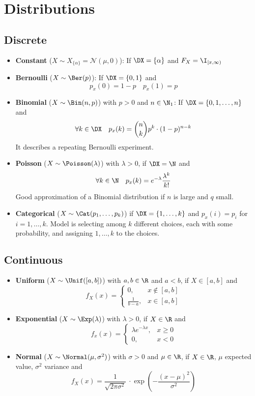 \section{Distributions}
\subsection{Discrete}
\begin{itemize}
  \item \textbf{Constant} (\(X \sim X_{\{\alpha\}} = \mathcal{N}(\mu, 0)\)): If \(\DX = \{\alpha\}\) and \(F_X = \I_{[x, \infty)}\)
  \item \textbf{Bernoulli} (\(X \sim \Ber(p)\)): If \(\DX = \{0, 1\}\) and
  \[p_x(0) = 1 - p \quad p_x(1) = p\]

  \item \textbf{Binomial} (\(X \sim \Bin(n, p)\)) with \(p > 0\) and \(n \in \N_1\): If \(\DX = \{0, 1, \ldots, n\}\) and
  \[\forall k \in \DX \quad p_x(k) = \binom{n}{k} p^k \cdot (1 - p)^{n -k}\]
  It describes a repeating Bernoulli experiment.

  \item \textbf{Poisson} (\(X \sim \Poisson(\lambda)\)) with \(\lambda > 0\), if \(\DX = \N\) and
  \[\forall k \in \N \quad p_x(k) = e^{-\lambda} \frac{\lambda^k}{k!}\]
  Good approximation of a Binomial distribution if \(n\) is large and \(q\) small.

  \item \textbf{Categorical} (\(X \sim \Cat(p_1, \ldots, p_k)\)) if \(\DX = \{1, \ldots, k\}\) and \(p_x(i) = p_i\) for \(i = 1, \ldots, k\). Model is selecting among \(k\) different choices, each with some probability, and assigning \(1, \ldots, k\) to the choices.
\end{itemize}


\subsection{Continuous}
\begin{itemize}
  \item \textbf{Uniform} (\(X \sim \Unif([a, b])\)) with \(a, b \in \R\) and \(a < b\), if \(X \in [a, b]\) and
  \[f_X(x) = \begin{cases}
    0, & x \notin [a, b] \\
    \frac{1}{b - a}, & x \in [a, b]
  \end{cases}\]

  \item \textbf{Exponential} (\(X \sim \Exp(\lambda)\)) with \(\lambda > 0\), if \(X \in \R\) and
  \[f_x(x) = \begin{cases}
    \lambda e^{-\lambda x}, & x \geq 0 \\
    0, & x < 0
  \end{cases}\]

  \item \textbf{Normal} (\(X \sim \Normal(\mu, \sigma^2)\)) with \(\sigma > 0\) and \(\mu \in \R\), if \(X \in \R\), \(\mu\) expected value, \(\sigma^2\) variance and
  \[f_X(x) = \frac{1}{\sqrt{2 \pi \sigma^2}}\ \cdot \exp(-\frac{(x - \mu)^2}{\sigma^2})\]
\end{itemize}